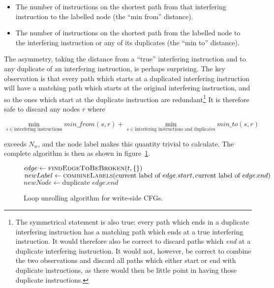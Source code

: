 \begin{itemize}
\item
  The number of instructions on the shortest path from that
  interfering instruction to the labelled node (the ``min from''
  distance).
\item
  The number of instructions on the shortest path from the labelled
  node to the interfering instruction or any of its duplicates (the
  ``min to'' distance).
\end{itemize}

The asymmetry, taking the distance from a ``true'' interfering
instruction and to any duplicate of an interfering instruction, is
perhaps surprising.  The key observation is that every path which
starts at a duplicated interfering instruction will have a matching
path which starts at the original interfering instruction, and so the
ones which start at the duplicate instruction are
redundant\footnote{The symmetrical statement is also true: every path
  which ends in a duplicate interfering instruction has a matching
  path which ends at a true interfering instruction.  It would
  therefore also be correct to discard paths which \emph{end} at a
  duplicate interfering instruction.  It would not, however, be
  correct to combine the two observations and discard all paths which
  either start or end with duplicate instructions, as there would then
  be little point in having those duplicate instructions.}  It is
therefore safe to discard any nodes $r$ where

\begin{displaymath}
\min_{s \in \textrm{interfering instructions}}min\_from(s, r) + \min_{s \in \textrm{interfering instructions and duplicates}}min\_to(s, r)
\end{displaymath}

exceeds $N_w$, and the node label makes this quantity trivial to
calculate.  The complete algorithm is then as shown in
figure~\ref{fig:derive:store_cfg_unroll_alg}.

\begin{figure}
\begin{algorithmic}
       \State $edge \gets \textsc{findEdgeToBeBroken}(t, \{\})$
       \State $newLabel \gets \textsc{combineLabels}(\text{current label of } edge.start, \text{current label of } edge.end)$
       \Else
           \State $newNode \gets \text{duplicate } edge.end$
           \EndFor
       \EndIf
    \EndWhile
  \EndFor
\end{algorithmic}
\caption{Loop unrolling algorithm for write-side CFGs.}
\label{fig:derive:store_cfg_unroll_alg}
\end{figure}


